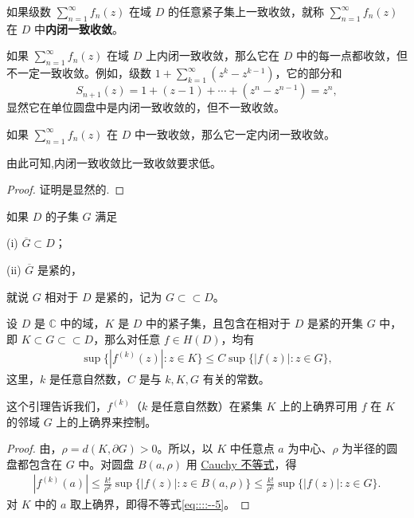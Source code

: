 \documentclass[../../main.tex]{subfiles}
\begin{document}
\begin{definition}
如果级数 \( \sum_{n=1}^{\infty} f_n(z) \) 在域 \( D \) 的任意紧子集上一致收敛，就称 \( \sum_{n=1}^{\infty} f_n(z) \) 在 \( D \) 中\textbf{内闭一致收敛}。
\end{definition}

\begin{remark}
如果 \( \sum_{n=1}^{\infty} f_n(z) \) 在域 \( D \) 上内闭一致收敛，那么它在 \( D \) 中的每一点都收敛，但不一定一致收敛。例如，级数 \( 1 + \sum_{k=1}^{\infty} (z^k - z^{k - 1}) \)，它的部分和
\[
S_{n + 1}(z) = 1 + (z - 1) + \cdots + (z^n - z^{n - 1}) = z^n,
\]
显然它在单位圆盘中是内闭一致收敛的，但不一致收敛。
\end{remark}

\begin{proposition}
如果 \( \sum_{n=1}^{\infty} f_n(z) \) 在 \( D \) 中一致收敛，那么它一定内闭一致收敛。
\end{proposition}
\begin{note}
由此可知,内闭一致收敛比一致收敛要求低。
\end{note}
\begin{proof}
证明是显然的.
\end{proof}

\begin{definition}
如果 \( D \) 的子集 \( G \) 满足

(i) \( \overline{G} \subset D \)；

(ii) \( \overline{G} \) 是紧的，

就说 \( G \) 相对于 \( D \) 是紧的，记为 \( G \subset\subset D \)。
\end{definition}

\begin{lemma}\label{lemma:引理4.1.8}
设 \( D \) 是 \( \mathbb{C} \) 中的域，\( K \) 是 \( D \) 中的紧子集，且包含在相对于 \( D \) 是紧的开集 \( G \) 中，即 \( K \subset G \subset\subset D \)，那么对任意 \( f \in H(D) \)，均有
\begin{align}
\sup\{|f^{(k)}(z)| : z \in K\} \leqslant C\sup\{|f(z)| : z \in G\},\label{eq::::--5}
\end{align}
这里，\( k \) 是任意自然数，\( C \) 是与 \( k, K, G \) 有关的常数。
\end{lemma}
\begin{note}
这个引理告诉我们，\( f^{(k)} \)（\( k \) 是任意自然数）在紧集 \( K \) 上的上确界可用 \( f \) 在 \( K \) 的邻域 \( G \) 上的上确界来控制。
\end{note}
\begin{proof}
由，\( \rho = d(K, \partial G) > 0 \)。所以，以 \( K \) 中任意点 \( a \) 为中心、\( \rho \) 为半径的圆盘都包含在 \( G \) 中。对圆盘 \( B(a, \rho) \) 用 \hyperref[theorem:Cauchy不等式-复变函数]{Cauchy 不等式}，得
\begin{align*}
|f^{(k)}(a)| \leqslant \frac{k!}{\rho^k}\sup\{|f(z)| : z \in B(a, \rho)\} \leqslant \frac{k!}{\rho^k}\sup\{|f(z)| : z \in G\}.
\end{align*}
对 \( K \) 中的 \( a \) 取上确界，即得不等式\eqref{eq::::--5}。
\end{proof}
\end{document}
